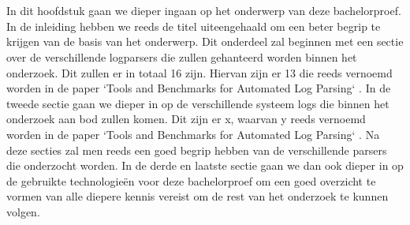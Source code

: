 \chapter{}
\label{ch:stand-van-zaken}






In dit hoofdstuk gaan we dieper ingaan op het onderwerp van deze bachelorproef. In de inleiding hebben we reeds de titel uiteengehaald om een beter begrip te krijgen van de basis van het onderwerp. Dit onderdeel zal beginnen met een sectie over de verschillende logparsers die zullen gehanteerd worden binnen het onderzoek. Dit zullen er in totaal 16 zijn. Hiervan zijn er 13 die reeds vernoemd worden in de paper `Tools and Benchmarks for Automated Log Parsing` \autocite{TBA2019}. In de tweede sectie gaan we dieper in op de verschillende systeem logs die binnen het onderzoek aan bod zullen komen. Dit zijn er x, waarvan y reeds vernoemd worden in de paper `Tools and Benchmarks for Automated Log Parsing` \autocite{TBA2019}. Na deze secties zal men reeds een goed begrip hebben van de verschillende parsers die onderzocht worden. In de derde en laatste sectie gaan we dan ook dieper in op de gebruikte technologieën voor deze bachelorproef om een goed overzicht te vormen van alle diepere kennis vereist om de rest van het onderzoek te kunnen volgen.

